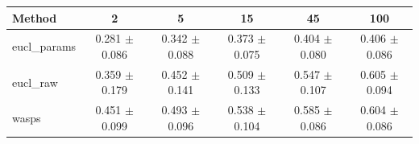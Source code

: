 \begin{table}[htbp]
\centering
\begin{NiceTabular}{lccccc}
\toprule
Method & 2 & 5 & 15 & 45 & 100 \\
\midrule
eucl\_params & 0.281 $\pm$ 0.086 & 0.342 $\pm$ 0.088 & 0.373 $\pm$ 0.075 & 0.404 $\pm$ 0.080 & 0.406 $\pm$ 0.086 \\
eucl\_raw & 0.359 $\pm$ 0.179 & 0.452 $\pm$ 0.141 & 0.509 $\pm$ 0.133 & 0.547 $\pm$ 0.107 & 0.605 $\pm$ 0.094 \\
wasps & 0.451 $\pm$ 0.099 & 0.493 $\pm$ 0.096 & 0.538 $\pm$ 0.104 & 0.585 $\pm$ 0.086 & 0.604 $\pm$ 0.086 \\
\bottomrule
\end{NiceTabular}
\label{tab:sens_cpazmal_n_train_knn}
\end{table}

